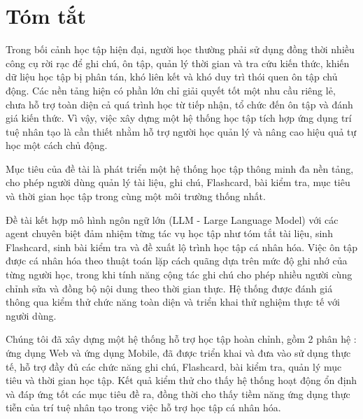 \chapter*{Tóm tắt}
\label{summary}

Trong bối cảnh học tập hiện đại, người học thường phải sử dụng đồng thời nhiều công cụ rời rạc để ghi chú, ôn tập, quản lý thời gian và tra cứu kiến thức, khiến dữ liệu học tập bị phân tán, khó liên kết và khó duy trì thói quen ôn tập chủ động. Các nền tảng hiện có phần lớn chỉ giải quyết tốt một nhu cầu riêng lẻ, chưa hỗ trợ toàn diện cả quá trình học từ tiếp nhận, tổ chức đến ôn tập và đánh giá kiến thức. Vì vậy, việc xây dựng một hệ thống học tập tích hợp ứng dụng trí tuệ nhân tạo là cần thiết nhằm hỗ trợ người học quản lý và nâng cao hiệu quả tự học một cách chủ động.

Mục tiêu của đề tài là phát triển một hệ thống học tập thông minh đa nền tảng, cho phép người dùng quản lý tài liệu, ghi chú, Flashcard, bài kiểm tra, mục tiêu và thời gian học tập trong cùng một môi trường thống nhất.

Đề tài kết hợp mô hình ngôn ngữ lớn (LLM - Large Language Model) với các agent chuyên biệt đảm nhiệm từng tác vụ học tập như tóm tắt tài liệu, sinh Flashcard, sinh bài kiểm tra và đề xuất lộ trình học tập cá nhân hóa. Việc ôn tập được cá nhân hóa theo thuật toán lặp cách quãng dựa trên mức độ ghi nhớ của từng người học, trong khi tính năng cộng tác ghi chú cho phép nhiều người cùng chỉnh sửa và đồng bộ nội dung theo thời gian thực. Hệ thống được đánh giá thông qua kiểm thử chức năng toàn diện và triển khai thử nghiệm thực tế với người dùng.

Chúng tôi đã xây dựng một hệ thống hỗ trợ học tập hoàn chỉnh, gồm 2 phân hệ : ứng dụng Web và ứng dụng Mobile, đã được triển khai và đưa vào sử dụng thực tế, hỗ trợ đầy đủ các chức năng ghi chú, Flashcard, bài kiểm tra, quản lý mục tiêu và thời gian học tập. Kết quả kiểm thử cho thấy hệ thống hoạt động ổn định và đáp ứng tốt các mục tiêu đề ra, đồng thời cho thấy tiềm năng ứng dụng thực tiễn của trí tuệ nhân tạo trong việc hỗ trợ học tập cá nhân hóa.
